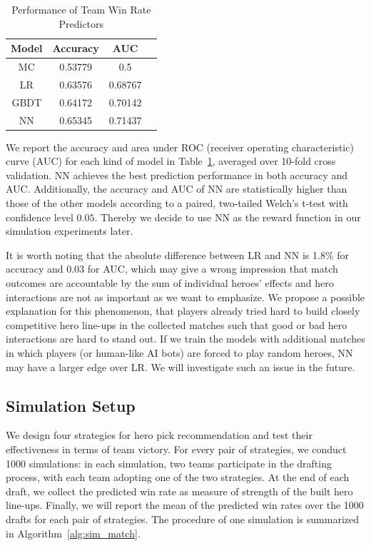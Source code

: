 \begin{table}
  \caption{Performance of Team Win Rate Predictors}
  \centering
  \label{tab:auc}
  \begin{tabular}{c@{\hskip 0.5in}c@{\hskip 0.36in}c@{\hskip 0.36in}c}
    \toprule
    Model  & Accuracy & AUC  \\
    \midrule
    MC   & 0.53779        & 0.5       \\
    LR   & 0.63576        & 0.68767    \\
    GBDT & 0.64172        & 0.70142   \\
	NN   & 0.65345        & 0.71437  \\
  \bottomrule
\end{tabular}
\end{table}


We report the accuracy and area under ROC (receiver operating characteristic) curve (AUC) for each kind of model in Table~\ref{tab:auc}, averaged over 10-fold cross validation. NN achieves the best prediction performance in both accuracy and AUC. Additionally, the accuracy and AUC of NN are statistically higher than those of the other models according to a paired, two-tailed Welch's t-test with confidence level $0.05$. Thereby we decide to use NN as the reward function in our simulation experiments later. 

It is worth noting that the absolute difference between LR and NN is 1.8\% for accuracy and 0.03 for AUC, which may give a wrong impression that match outcomes are accountable by the sum of individual heroes' effects and hero interactions are not as important as we want to emphasize. We propose a possible explanation for this phenomenon, that players already tried hard to build closely competitive hero line-ups in the collected matches such that good or bad hero interactions are hard to stand out. If we train the models with additional matches in which players (or human-like AI bots) are forced to play random heroes, NN may have a larger edge over LR. We will investigate such an issue in the future.




\subsection{Simulation Setup}
We design four strategies for hero pick recommendation and test their effectiveness in terms of team victory. For every pair of strategies, we conduct 1000 simulations: in each simulation, two teams participate in the drafting process, with each team adopting one of the two strategies. At the end of each draft, we collect the predicted win rate as measure of strength of the built hero line-ups. Finally, we will report the mean of the predicted win rates over the 1000 drafts for each pair of strategies. The procedure of one simulation is summarized in Algorithm~\ref{alg:sim_match}.


